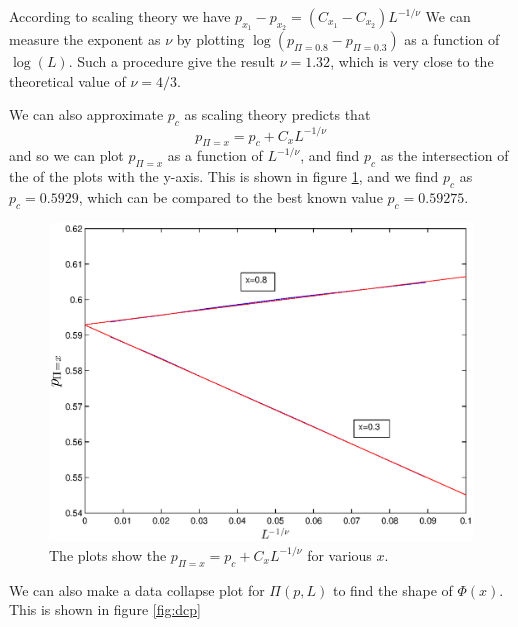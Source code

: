 \documentclass[12pt]{article}
\begin{document}
According to scaling theory we have $p_{x_1} - p_{x_2} = (C_{x_1} - C_{x_2})L^{-1/\nu}$ We can measure the exponent as $\nu$ by plotting $\log(p_{\Pi=0.8}-p_{\Pi=0.3})$ as a function of $\log(L)$. Such a procedure give the result $\nu = 1.32$, which is very close to the theoretical value of $\nu = 4/3$.

We can also approximate $p_c$ as scaling theory predicts that 
\begin{equation}
 p_{\Pi = x} = p_c + C_x L^{-1/\nu}
\end{equation}
and so we can plot $p_{\Pi = x}$ as a function of $L^{-1/\nu}$, and find $p_c$ as the intersection of the of the plots with the y-axis. This is shown in figure \ref{fig:9}, and we find $p_c$ as $p_c = 0.5929$, which can be compared to the best known value $p_c = 0.59275$.

\begin{figure}[ht]
\centering

	\includegraphics[width=13cm]{intersection.eps}


\caption[Optional caption for list of figures]{The plots show the $p_{\Pi = x} = p_c + C_x L^{-1/\nu}$ for various $x$.}
\label{fig:9}
\end{figure}

We can also make a data collapse plot for $\Pi(p,L)$ to find the shape of $\Phi(x)$. This is shown in figure \ref{fig:dcp}
\end{document}
